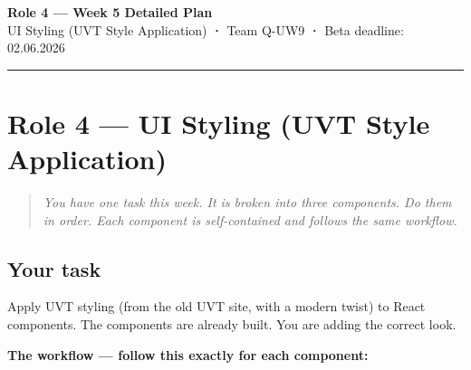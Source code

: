 \documentclass[11pt,a4paper]{article}
\begin{document}
\begin{center}
    {\Large\bfseries\color{uvtBlue} Role 4 — Week 5 Detailed Plan}\\[0.4em]
    {\small UI Styling (UVT Style Application) \textbf{·} Team Q-UW9 \textbf{·} Beta deadline: 02.06.2026}
\end{center}
\vspace{0.3em}
\textcolor{uvtYellow}{\rule{\linewidth}{2pt}}
\vspace{0.8em}
\section{Role 4 — UI Styling (UVT Style Application)}

\begin{quote}\itshape
You have one task this week. It is broken into three components. Do them in order. Each component is self-contained and follows the same workflow.
\end{quote}

\subsection{Your task}

Apply UVT styling (from the old UVT site, with a modern twist) to React components. The components are already built. You are adding the correct look.

\textbf{The workflow — follow this exactly for each component:}
\end{document}
